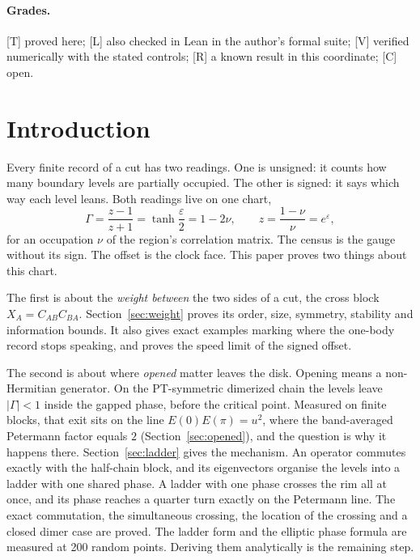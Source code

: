 \documentclass[11pt]{article}
\theoremstyle{definition}
\newcommand{\grade}[1]{\textsf{\small[#1]}}
\begin{document}
\paragraph{Grades.} \grade{T} proved here; \grade{L} also checked in Lean in the author's formal suite; \grade{V} verified numerically with the stated controls; \grade{R} a known result in this coordinate; \grade{C} open.

\section{Introduction}
Every finite record of a cut has two readings. One is unsigned: it counts how many boundary levels are partially occupied. The other is signed: it says which way each level leans. Both readings live on one chart,
\[
\Gamma=\frac{z-1}{z+1}=\tanh\frac{\varepsilon}{2}=1-2\nu,\qquad z=\frac{1-\nu}{\nu}=e^{\varepsilon},
\]
for an occupation $\nu$ of the region's correlation matrix. The census is the gauge without its sign. The offset is the clock face. This paper proves two things about this chart.

The first is about the \emph{weight between} the two sides of a cut, the cross block $X_A=C_{AB}C_{BA}$. Section~\ref{sec:weight} proves its order, size, symmetry, stability and information bounds. It also gives exact examples marking where the one-body record stops speaking, and proves the speed limit of the signed offset.

The second is about where \emph{opened} matter leaves the disk. Opening means a non-Hermitian generator. On the PT-symmetric dimerized chain the levels leave $|\Gamma|<1$ inside the gapped phase, before the critical point. Measured on finite blocks, that exit sits on the line $E(0)E(\pi)=u^2$, where the band-averaged Petermann factor equals $2$ (Section~\ref{sec:opened}), and the question is why it happens there. Section~\ref{sec:ladder} gives the mechanism. An operator commutes exactly with the half-chain block, and its eigenvectors organise the levels into a ladder with one shared phase. A ladder with one phase crosses the rim all at once, and its phase reaches a quarter turn exactly on the Petermann line. The exact commutation, the simultaneous crossing, the location of the crossing and a closed dimer case are proved. The ladder form and the elliptic phase formula are measured at 200 random points. Deriving them analytically is the remaining step.
\end{document}
